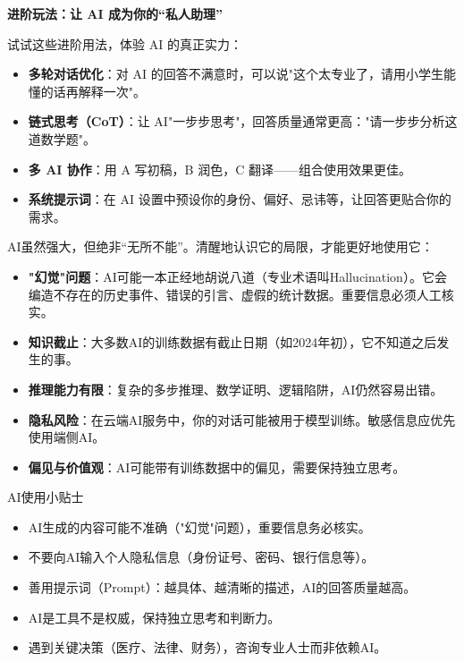 \textbf{进阶玩法：让 AI 成为你的“私人助理”}\par

试试这些进阶用法，体验 AI 的真正实力：

\begin{itemize}
  \item \textbf{多轮对话优化}：对 AI 的回答不满意时，可以说"这个太专业了，请用小学生能懂的话再解释一次"。
  \item \textbf{链式思考（CoT）}：让 AI"一步步思考"，回答质量通常更高："请一步步分析这道数学题"。
  \item \textbf{多 AI 协作}：用 A 写初稿，B 润色，C 翻译——组合使用效果更佳。
  \item \textbf{系统提示词}：在 AI 设置中预设你的身份、偏好、忌讳等，让回答更贴合你的需求。
\end{itemize}


AI虽然强大，但绝非“无所不能”。清醒地认识它的局限，才能更好地使用它：

\begin{itemize}
  \item \textbf{"幻觉"问题}：AI可能一本正经地胡说八道（专业术语叫Hallucination）。它会编造不存在的历史事件、错误的引言、虚假的统计数据。重要信息必须人工核实。
  \item \textbf{知识截止}：大多数AI的训练数据有截止日期（如2024年初），它不知道之后发生的事。
  \item \textbf{推理能力有限}：复杂的多步推理、数学证明、逻辑陷阱，AI仍然容易出错。
  \item \textbf{隐私风险}：在云端AI服务中，你的对话可能被用于模型训练。敏感信息应优先使用端侧AI。
  \item \textbf{偏见与价值观}：AI可能带有训练数据中的偏见，需要保持独立思考。
\end{itemize}

\begin{tcbinfo}{AI使用小贴士}
\begin{itemize}
  \item AI生成的内容可能不准确（"幻觉"问题），重要信息务必核实。
  \item 不要向AI输入个人隐私信息（身份证号、密码、银行信息等）。
  \item 善用提示词（Prompt）：越具体、越清晰的描述，AI的回答质量越高。
  \item AI是工具不是权威，保持独立思考和判断力。
  \item 遇到关键决策（医疗、法律、财务），咨询专业人士而非依赖AI。
\end{itemize}

\end{tcbinfo}

